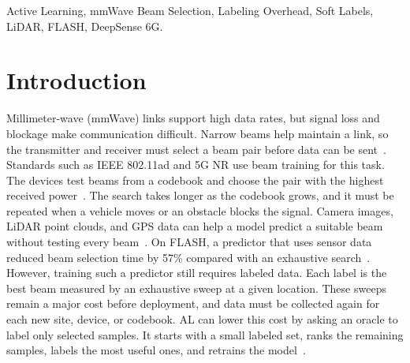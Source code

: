 \documentclass[journal,onecolumn]{IEEEtran}
\begin{document}
\begin{IEEEkeywords}
  Active Learning, mmWave Beam Selection, Labeling Overhead, Soft Labels, LiDAR, FLASH, DeepSense 6G.
\end{IEEEkeywords}

\IEEEpeerreviewmaketitle

\section{Introduction}\label{sec:intro}

Millimeter-wave (mmWave) links support high data rates, but signal loss and blockage make communication difficult. Narrow beams help maintain a link, so the transmitter and receiver must select a beam pair before data can be sent~\cite{heath2016overview}. Standards such as IEEE 802.11ad and 5G NR use beam training for this task. The devices test beams from a codebook and choose the pair with the highest received power~\cite{giordani2019tutorial}. The search takes longer as the codebook grows, and it must be repeated when a vehicle moves or an obstacle blocks the signal. Camera images, LiDAR point clouds, and GPS data can help a model predict a suitable beam without testing every beam~\cite{klautau2019lidar,charan2022vision,salehi2022flash,alkhateeb2023deepsense}. On FLASH, a predictor that uses sensor data reduced beam selection time by 57\% compared with an exhaustive search~\cite{salehi2022flash}. However, training such a predictor still requires labeled data. Each label is the best beam measured by an exhaustive sweep at a given location. These sweeps remain a major cost before deployment, and data must be collected again for each new site, device, or codebook. AL can lower this cost by asking an oracle to label only selected samples. It starts with a small labeled set, ranks the remaining samples, labels the most useful ones, and retrains the model~\cite{settles2009survey,ren2021survey}.
\end{document}
